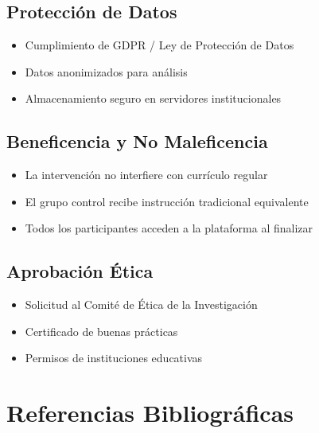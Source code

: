 \documentclass[12pt,a4paper]{article}
\begin{document}
\subsection{Protección de Datos}
\begin{itemize}
    \item Cumplimiento de GDPR / Ley de Protección de Datos
    \item Datos anonimizados para análisis
    \item Almacenamiento seguro en servidores institucionales
\end{itemize}

\subsection{Beneficencia y No Maleficencia}
\begin{itemize}
    \item La intervención no interfiere con currículo regular
    \item El grupo control recibe instrucción tradicional equivalente
    \item Todos los participantes acceden a la plataforma al finalizar
\end{itemize}

\subsection{Aprobación Ética}
\begin{itemize}
    \item Solicitud al Comité de Ética de la Investigación
    \item Certificado de buenas prácticas
    \item Permisos de instituciones educativas
\end{itemize}

\section{Referencias Bibliográficas}
\end{document}
